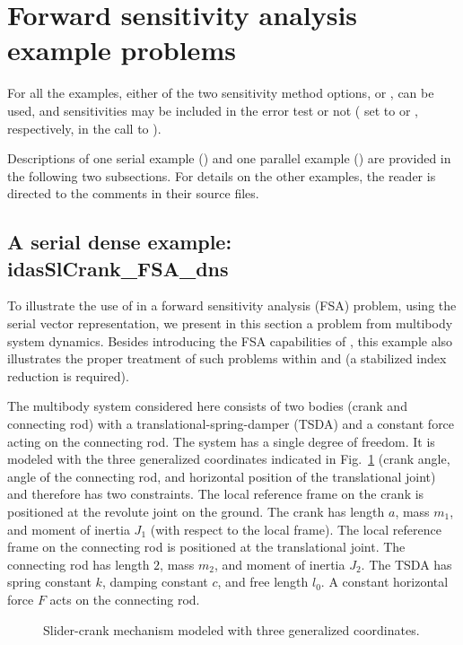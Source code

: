 \section{Forward sensitivity analysis example problems}\label{s:fwd_ex}

For all the {\idas} examples, either of the two sensitivity method options,
 or , can be used, 
and sensitivities may be included in the error test or not 
( set to  or , respectively, in the
call to ).

Descriptions of one serial example () and
one parallel example () are provided
in the following two subsections.  For details on the other examples,
the reader is directed to the comments in their source files.



\subsection{A serial dense example: idasSlCrank\_FSA\_dns}
\label{ss:idasSlCrank_FSA_dns}
To illustrate the use of {\idas} in a forward sensitivity analysis (FSA) problem, using
the serial vector representation, we present in this section a problem from
multibody system dynamics. Besides introducing the FSA capabilities of {\idas},
this example also illustrates the proper treatment of such problems within {\ida} and {\idas}
(a stabilized index reduction is required). 

The multibody system considered here consists of two bodies (crank and connecting
rod) with a translational-spring-damper (TSDA) and a constant force acting on the
connecting rod.  The system has a single degree of freedom. It is modeled with the
three generalized coordinates indicated in Fig.~\ref{f:sl_crank}
(crank angle, angle of the connecting rod, and horizontal position of the
translational joint) and therefore has two constraints. The local reference
frame on the crank is positioned at the revolute joint on the ground. 
The crank has length $a$, mass $m_1$, and moment of inertia $J_1$ (with respect to
the local frame).
The local reference frame on the connecting rod is positioned at the translational joint. 
The connecting rod has length $2$, mass $m_2$, and moment of inertia $J_2$.
The TSDA has spring constant $k$, damping constant $c$, and free length $l_0$.
A constant horizontal force $F$ acts on the connecting rod.
\begin{figure}[h]
  {\centerline{}}
  \caption{Slider-crank mechanism modeled with three generalized coordinates.}
  \label{f:sl_crank}
\end{figure}

